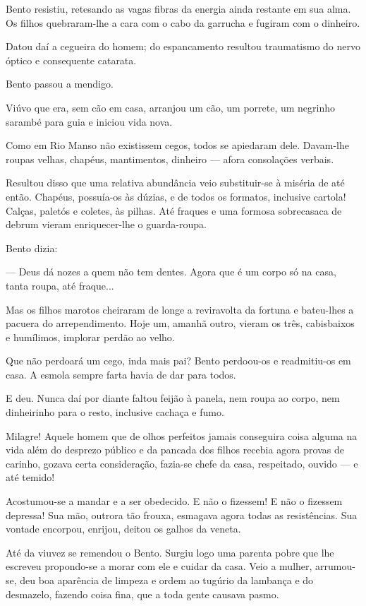 Bento resistiu, retesando as vagas fibras da energia ainda restante em
sua alma. Os filhos quebraram-lhe a cara com o cabo da garrucha e
fugiram com o dinheiro.

Datou daí a cegueira do homem; do espancamento resultou traumatismo do
nervo óptico e consequente catarata.

Bento passou a mendigo.

Viúvo que era, sem cão em casa, arranjou um cão, um porrete, um negrinho
sarambé para guia e iniciou vida nova.

Como em Rio Manso não existissem cegos, todos se apiedaram dele.
Davam-lhe roupas velhas, chapéus, mantimentos, dinheiro --- afora
consolações verbais.

Resultou disso que uma relativa abundância veio substituir-se à miséria
de até então. Chapéus, possuía-os às dúzias, e de todos os formatos,
inclusive cartola! Calças, paletós e coletes, às pilhas. Até fraques e
uma formosa sobrecasaca de debrum vieram enriquecer-lhe o guarda-roupa.

Bento dizia:

--- Deus dá nozes a quem não tem dentes. Agora que é um corpo só na
casa, tanta roupa, até fraque...

Mas os filhos marotos cheiraram de longe a reviravolta da fortuna e
bateu-lhes a pacuera do arrependimento. Hoje um, amanhã outro, vieram os
três, cabisbaixos e humílimos, implorar perdão ao velho.

Que não perdoará um cego, inda mais pai? Bento perdoou-os e readmitiu-os
em casa. A esmola sempre farta havia de dar para todos.

E deu. Nunca daí por diante faltou feijão à panela, nem roupa ao corpo,
nem dinheirinho para o resto, inclusive cachaça e fumo.

Milagre! Aquele homem que de olhos perfeitos jamais conseguira coisa
alguma na vida além do desprezo público e da pancada dos filhos recebia
agora provas de carinho, gozava certa consideração, fazia-se chefe da
casa, respeitado, ouvido --- e até temido!

Acostumou-se a mandar e a ser obedecido. E não o fizessem! E não o
fizessem depressa! Sua mão, outrora tão frouxa, esmagava agora todas as
resistências. Sua vontade encorpou, enrijou, deitou os galhos da veneta.

Até da viuvez se remendou o Bento. Surgiu logo uma parenta pobre que lhe
escreveu propondo-se a morar com ele e cuidar da casa. Veio a mulher,
arrumou-se, deu boa aparência de limpeza e ordem ao tugúrio da lambança
e do desmazelo, fazendo coisa fina, que a toda gente causava pasmo.

